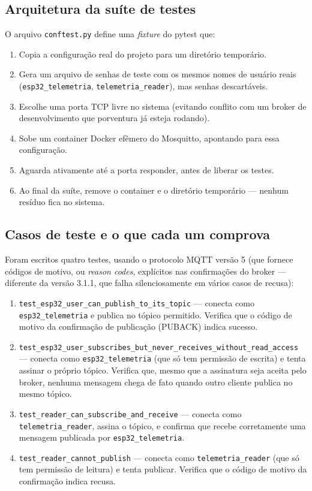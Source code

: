 \documentclass[11pt,a4paper]{article}
\begin{document}
\subsection{Arquitetura da suíte de testes}

O arquivo \texttt{conftest.py} define uma \textit{fixture} do pytest que:

\begin{enumerate}
    \item Copia a configuração real do projeto para um diretório temporário.
    \item Gera um arquivo de senhas de teste com os mesmos nomes de usuário reais (\texttt{esp32\_telemetria}, \texttt{telemetria\_reader}), mas senhas descartáveis.
    \item Escolhe uma porta TCP livre no sistema (evitando conflito com um broker de desenvolvimento que porventura já esteja rodando).
    \item Sobe um container Docker efêmero do Mosquitto, apontando para essa configuração.
    \item Aguarda ativamente até a porta responder, antes de liberar os testes.
    \item Ao final da suíte, remove o container e o diretório temporário --- nenhum resíduo fica no sistema.
\end{enumerate}

\subsection{Casos de teste e o que cada um comprova}

Foram escritos quatro testes, usando o protocolo MQTT versão 5 (que fornece códigos de motivo, ou \textit{reason codes}, explícitos nas confirmações do broker --- diferente da versão 3.1.1, que falha silenciosamente em vários casos de recusa):

\begin{enumerate}[label=\textbf{Teste \arabic*}]
    \item \texttt{test\_esp32\_user\_can\_publish\_to\_its\_topic} --- conecta como \texttt{esp32\_telemetria} e publica no tópico permitido. Verifica que o código de motivo da confirmação de publicação (PUBACK) indica sucesso.
    \item \texttt{test\_esp32\_user\_subscribes\_but\_never\_receives\_without\_read\_access} --- conecta como \texttt{esp32\_telemetria} (que só tem permissão de escrita) e tenta assinar o próprio tópico. Verifica que, mesmo que a assinatura seja aceita pelo broker, nenhuma mensagem chega de fato quando outro cliente publica no mesmo tópico.
    \item \texttt{test\_reader\_can\_subscribe\_and\_receive} --- conecta como \texttt{telemetria\_reader}, assina o tópico, e confirma que recebe corretamente uma mensagem publicada por \texttt{esp32\_telemetria}.
    \item \texttt{test\_reader\_cannot\_publish} --- conecta como \texttt{telemetria\_reader} (que só tem permissão de leitura) e tenta publicar. Verifica que o código de motivo da confirmação indica recusa.
\end{enumerate}
\end{document}
